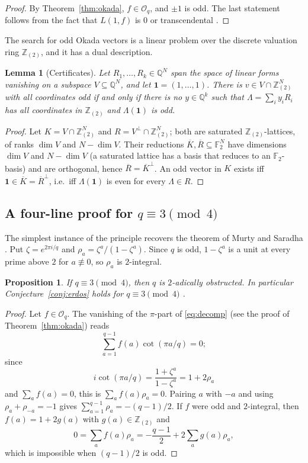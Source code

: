 \documentclass[11pt]{amsart}
\newtheorem{lemma}[theorem]{Lemma}
\newtheorem{proposition}[theorem]{Proposition}
\theoremstyle{definition}
\theoremstyle{remark}
\providecommand{\Q}{\mathbb Q}
\newcommand{\Zt}{\mathbb Z_{(2)}}
\newcommand{\F}{\mathbb F}
\newcommand{\Ok}{\mathcal O}
\numberwithin{equation}{section}
\begin{document}
\begin{proof}
By Theorem~\ref{thm:okada}, $f\in\Ok_q$, and $\pm1$ is odd.
The last statement follows from the fact that $L(1,f)$ is $0$ or transcendental \cite{BBW73,MS07}.
\end{proof}

The search for odd Okada vectors is a linear problem over the discrete valuation ring $\Zt$, and it has a dual description.

\begin{lemma}[Certificates]\label{lem:farkas}
Let $R_1,\dots,R_k\in\Q^N$ span the space of linear forms vanishing on a subspace $V\subseteq\Q^N$, and let $\mathbf 1=(1,\dots,1)$.
There is $v\in V\cap\Zt^N$ with all coordinates odd if and only if there is no $y\in\Q^k$ such that $\Lambda=\sum_iy_iR_i$ has all coordinates in $\Zt$ and $\Lambda(\mathbf 1)$ is odd.
\end{lemma}

\begin{proof}
Let $K=V\cap\Zt^N$ and $R=V^\perp\cap\Zt^N$; both are saturated $\Zt$-lattices, of ranks $\dim V$ and $N-\dim V$.
Their reductions $\overline K,\overline R\subseteq\F_2^N$ have dimensions $\dim V$ and $N-\dim V$ (a saturated lattice has a basis that reduces to an $\F_2$-basis) and are orthogonal, hence $\overline R=\overline K^{\perp}$.
An odd vector in $K$ exists iff $\mathbf 1\in\overline K=\overline R^{\perp}$, i.e.\ iff $\Lambda(\mathbf 1)$ is even for every $\Lambda\in R$.
\end{proof}

\subsection{\texorpdfstring{A four-line proof for $q\equiv3\pmod4$}{A four-line proof for q = 3 mod 4}}
The simplest instance of the principle recovers the theorem of Murty and Saradha \cite{MS10}.
Put $\zeta=e^{2\pi i/q}$ and $\rho_a=\zeta^a/(1-\zeta^a)$.
Since $q$ is odd, $1-\zeta^a$ is a unit at every prime above $2$ for $a\not\equiv0$, so $\rho_a$ is $2$-integral.

\begin{proposition}\label{prop:MS}
If $q\equiv3\pmod 4$, then $q$ is $2$-adically obstructed.
In particular Conjecture~\ref{conj:erdos} holds for $q\equiv 3\pmod 4$ \cite{MS10}.
\end{proposition}

\begin{proof}
Let $f\in\Ok_q$.
The vanishing of the $\pi$-part of \eqref{eq:decomp} (see the proof of Theorem~\ref{thm:okada}) reads
\[
\sum_{a=1}^{q-1}f(a)\cot(\pi a/q)=0;
\]
since
\[
i\cot(\pi a/q)=\frac{1+\zeta^a}{1-\zeta^a}=1+2\rho_a
\]
and $\sum_af(a)=0$, this is $\sum_af(a)\rho_a=0$.
Pairing $a$ with $-a$ and using $\rho_a+\rho_{-a}=-1$ gives $\sum_{a=1}^{q-1}\rho_a=-(q-1)/2$.
If $f$ were odd and $2$-integral, then $f(a)=1+2g(a)$ with $g(a)\in\Zt$ and
\[
0=\sum_af(a)\rho_a=-\frac{q-1}2+2\sum_ag(a)\rho_a,
\]
which is impossible when $(q-1)/2$ is odd.
\end{proof}
\end{document}
